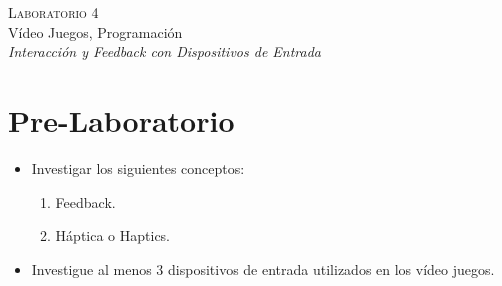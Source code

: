 \begin{center}
\textsc{\Large Laboratorio 4}~\\
{\large Vídeo Juegos, Programación}~\\
\emph{Interacción y \emph{Feedback} con Dispositivos de Entrada}
\end{center}

\section{Pre-Laboratorio}
\begin{itemize}
\item Investigar los siguientes conceptos:
\begin{enumerate}
  \item Feedback.
  \item Háptica o Haptics.
\end{enumerate}
\item Investigue al menos 3 dispositivos de entrada utilizados en los vídeo juegos.
\end{itemize}

